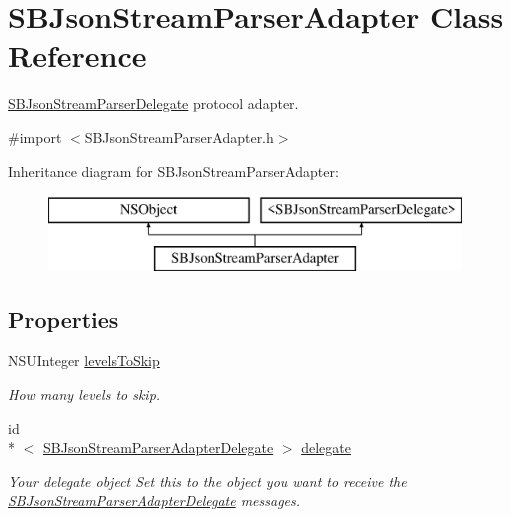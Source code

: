 \hypertarget{interface_s_b_json_stream_parser_adapter}{\section{S\-B\-Json\-Stream\-Parser\-Adapter Class Reference}
\label{interface_s_b_json_stream_parser_adapter}
}


\hyperlink{protocol_s_b_json_stream_parser_delegate-p}{S\-B\-Json\-Stream\-Parser\-Delegate} protocol adapter.  




{\ttfamily \#import $<$S\-B\-Json\-Stream\-Parser\-Adapter.\-h$>$}

Inheritance diagram for S\-B\-Json\-Stream\-Parser\-Adapter\-:\begin{figure}[H]
\begin{center}
\leavevmode
\includegraphics[height=2.000000cm]{interface_s_b_json_stream_parser_adapter}
\end{center}
\end{figure}
\subsection*{Properties}
\begin{DoxyCompactItemize}
\item 
N\-S\-U\-Integer \hyperlink{interface_s_b_json_stream_parser_adapter_a1b7451c67d9149b14632c228909659bb}{levels\-To\-Skip}
\begin{DoxyCompactList}\small\item\em How many levels to skip. \end{DoxyCompactList}\item 
\hypertarget{interface_s_b_json_stream_parser_adapter_a9d336f9c9e1caf3291f80918cb13188e}{id\\*
$<$ \hyperlink{protocol_s_b_json_stream_parser_adapter_delegate-p}{S\-B\-Json\-Stream\-Parser\-Adapter\-Delegate} $>$ \hyperlink{interface_s_b_json_stream_parser_adapter_a9d336f9c9e1caf3291f80918cb13188e}{delegate}}\label{interface_s_b_json_stream_parser_adapter_a9d336f9c9e1caf3291f80918cb13188e}

\begin{DoxyCompactList}\small\item\em Your delegate object Set this to the object you want to receive the \hyperlink{protocol_s_b_json_stream_parser_adapter_delegate-p}{S\-B\-Json\-Stream\-Parser\-Adapter\-Delegate} messages. \end{DoxyCompactList}\end{DoxyCompactItemize}
